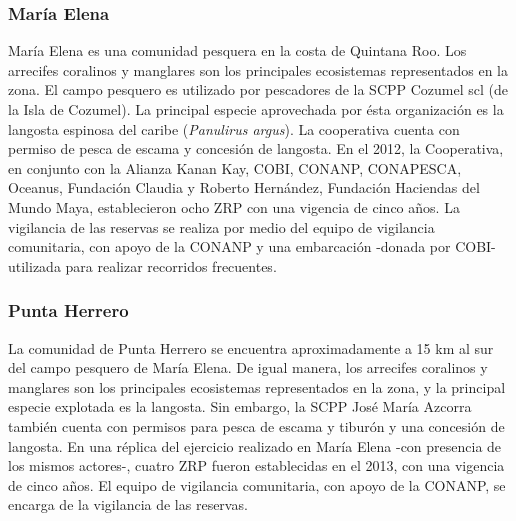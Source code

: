 \documentclass{frontiersSCNS}
\begin{document}
\subsubsection{María Elena}\label{maria-elena}

María Elena es una comunidad pesquera en la costa de Quintana Roo. Los
arrecifes coralinos y manglares son los principales ecosistemas
representados en la zona. El campo pesquero es utilizado por pescadores
de la SCPP Cozumel scl (de la Isla de Cozumel). La principal especie
aprovechada por ésta organización es la langosta espinosa del caribe
(\emph{Panulirus argus}). La cooperativa cuenta con permiso de pesca de
escama y concesión de langosta. En el 2012, la Cooperativa, en conjunto
con la Alianza Kanan Kay, COBI, CONANP, CONAPESCA, Oceanus, Fundación
Claudia y Roberto Hernández, Fundación Haciendas del Mundo Maya,
establecieron ocho ZRP con una vigencia de cinco años. La vigilancia de
las reservas se realiza por medio del equipo de vigilancia comunitaria,
con apoyo de la CONANP y una embarcación -donada por COBI- utilizada
para realizar recorridos frecuentes.

\subsubsection{Punta Herrero}\label{punta-herrero}

La comunidad de Punta Herrero se encuentra aproximadamente a 15 km al
sur del campo pesquero de María Elena. De igual manera, los arrecifes
coralinos y manglares son los principales ecosistemas representados en
la zona, y la principal especie explotada es la langosta. Sin embargo,
la SCPP José María Azcorra también cuenta con permisos para pesca de
escama y tiburón y una concesión de langosta. En una réplica del
ejercicio realizado en María Elena -con presencia de los mismos
actores-, cuatro ZRP fueron establecidas en el 2013, con una vigencia de
cinco años. El equipo de vigilancia comunitaria, con apoyo de la CONANP,
se encarga de la vigilancia de las reservas.
\end{document}
